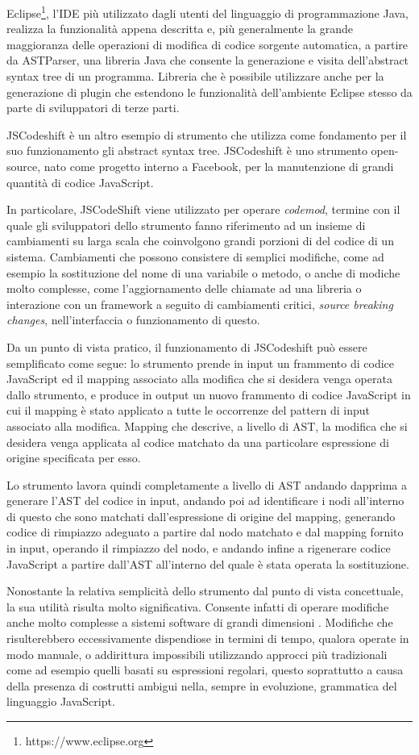 Eclipse\footnote{https://www.eclipse.org}, l’IDE più utilizzato dagli utenti del
linguaggio di programmazione Java, realizza la funzionalità appena descritta e,
più generalmente la grande maggioranza delle operazioni di modifica di codice
sorgente automatica, a partire da ASTParser, una libreria Java che consente la
generazione e visita dell’abstract syntax tree di un programma. Libreria che è
possibile utilizzare anche per la generazione di plugin che estendono le
funzionalità dell’ambiente Eclipse stesso da parte di sviluppatori di terze
parti.

JSCodeshift \cite{jscodeshift2016} è un altro esempio di strumento che utilizza
come fondamento per il suo funzionamento gli abstract syntax tree. JSCodeshift
è uno strumento open-source, nato come progetto interno a Facebook\texttrademark,
per la manutenzione di grandi quantità di codice JavaScript.

In particolare, JSCodeShift viene utilizzato per operare \textit{codemod},
termine con il quale gli sviluppatori dello strumento fanno riferimento ad un
insieme di cambiamenti su larga scala che coinvolgono grandi porzioni di del
codice di un sistema. Cambiamenti che possono consistere di semplici modifiche,
come ad esempio la sostituzione del nome di una variabile o metodo, o anche di
modiche molto complesse, come l'aggiornamento delle chiamate ad una libreria o
interazione con un framework a seguito di cambiamenti critici, \textit{source
breaking changes}, nell'interfaccia o funzionamento di questo.

Da un punto di vista pratico, il funzionamento di JSCodeshift può essere
semplificato come segue: lo strumento prende in input un frammento di codice
JavaScript ed il mapping associato alla modifica che si desidera venga operata
dallo strumento, e produce in output un nuovo frammento di codice JavaScript in
cui il mapping è stato applicato a tutte le occorrenze del pattern di input
associato alla modifica. Mapping che descrive, a livello di AST, la modifica che
si desidera venga applicata al codice matchato da una particolare espressione di
origine specificata per esso.

Lo strumento lavora quindi completamente a livello di AST andando dapprima a
generare l’AST del codice in input, andando poi ad identificare i nodi
all’interno di questo che sono matchati dall’espressione di origine del mapping,
generando codice di rimpiazzo adeguato a partire dal nodo matchato e dal mapping
fornito in input, operando il rimpiazzo del nodo, e andando infine a rigenerare
codice JavaScript a partire dall’AST all’interno del quale è stata operata la
sostituzione.

Nonostante la relativa semplicità dello strumento dal punto di vista
concettuale, la sua utilità risulta molto significativa. Consente infatti di
operare modifiche anche molto complesse a sistemi software di grandi dimensioni
\cite{jsconf2016}. Modifiche che risulterebbero eccessivamente dispendiose in
termini di tempo, qualora operate in modo manuale, o addirittura impossibili
utilizzando approcci più tradizionali come ad esempio quelli basati su
espressioni regolari, questo soprattutto a causa della presenza di costrutti
ambigui nella, sempre in evoluzione, grammatica del linguaggio JavaScript.
